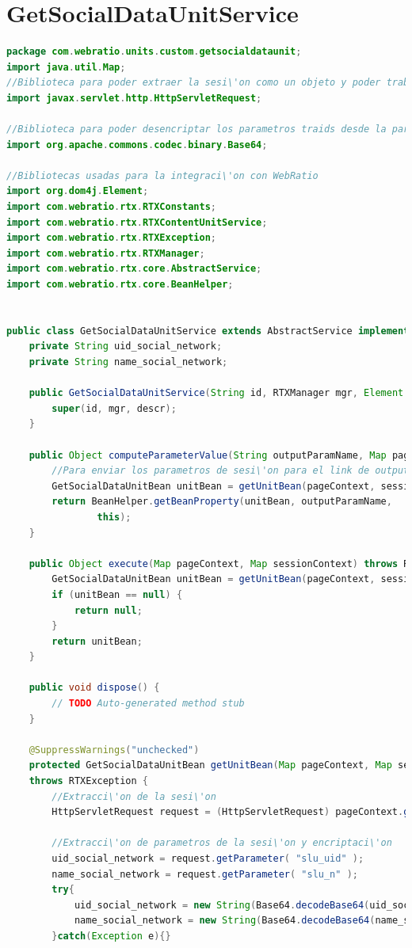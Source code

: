 \documentclass[oneside,12pt,a4paper]{memoir}%
\begin{document}
\section{GetSocialDataUnitService}
\begin{landscape}
\begin{lstlisting}[language=java, style=eclipse] 
package com.webratio.units.custom.getsocialdataunit;
import java.util.Map;
//Biblioteca para poder extraer la sesi\'on como un objeto y poder trabajar con este
import javax.servlet.http.HttpServletRequest;

//Biblioteca para poder desencriptar los parametros traids desde la parte cliente
import org.apache.commons.codec.binary.Base64;

//Bibliotecas usadas para la integraci\'on con WebRatio
import org.dom4j.Element;
import com.webratio.rtx.RTXConstants;
import com.webratio.rtx.RTXContentUnitService;
import com.webratio.rtx.RTXException;
import com.webratio.rtx.RTXManager;
import com.webratio.rtx.core.AbstractService;
import com.webratio.rtx.core.BeanHelper;


public class GetSocialDataUnitService extends AbstractService implements RTXContentUnitService{
	private String uid_social_network;
	private String name_social_network;

	public GetSocialDataUnitService(String id, RTXManager mgr, Element descr) throws RTXException {
		super(id, mgr, descr);
	}

	public Object computeParameterValue(String outputParamName, Map pageContext, Map sessionContext) throws RTXException {
		//Para enviar los parametros de sesi\'on para el link de output
		GetSocialDataUnitBean unitBean = getUnitBean(pageContext, sessionContext);
		return BeanHelper.getBeanProperty(unitBean, outputParamName,
				this);
	}

	public Object execute(Map pageContext, Map sessionContext) throws RTXException {
		GetSocialDataUnitBean unitBean = getUnitBean(pageContext, sessionContext);
		if (unitBean == null) {
			return null;
		}
		return unitBean;
	}

	public void dispose() {
		// TODO Auto-generated method stub
	}

	@SuppressWarnings("unchecked")
	protected GetSocialDataUnitBean getUnitBean(Map pageContext, Map sessionContext)
	throws RTXException {
		//Extracci\'on de la sesi\'on
		HttpServletRequest request = (HttpServletRequest) pageContext.get(RTXConstants.HTTP_SERVLET_REQUEST_KEY);
		
		//Extracci\'on de parametros de la sesi\'on y encriptaci\'on
		uid_social_network = request.getParameter( "slu_uid" );
		name_social_network = request.getParameter( "slu_n" );
		try{
			uid_social_network = new String(Base64.decodeBase64(uid_social_network));
			name_social_network = new String(Base64.decodeBase64(name_social_network));
		}catch(Exception e){}	


\end{lstlisting}
\end{landscape}
\end{document}
